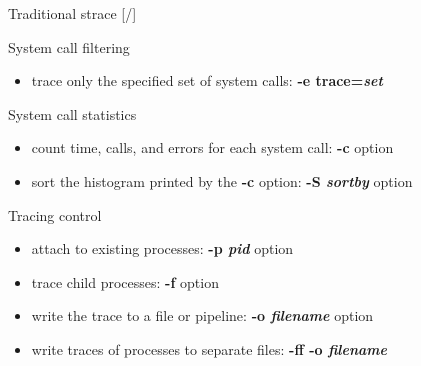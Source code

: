 \documentclass[unicode,aspectratio=169]{beamer}
\begin{document}
\begin{frame}{Traditional strace \hfill [\insertframenumber/\inserttotalframenumber]}
\begin{block}{\large System call filtering}
\begin{itemize}
\item trace only the specified set of system calls: \textbf{-e trace=\textit{set}}
\end{itemize}
\end{block}

\begin{block}{\large System call statistics}
\begin{itemize}
\item count time, calls, and errors for each system call: \textbf{-c} option
\item sort the histogram printed by the \textbf{-c} option: \textbf{-S \textit{sortby}} option
\end{itemize}
\end{block}

\begin{block}{\large Tracing control}
\begin{itemize}
\item attach to existing processes: \textbf{-p \textit{pid}} option
\item trace child processes: \textbf{-f} option
\item write the trace to a file or pipeline: \textbf{-o \textit{filename}} option
\item write traces of processes to separate files: \textbf{-ff -o \textit{filename}}
\end{itemize}
\end{block}
\end{frame}
\end{document}
